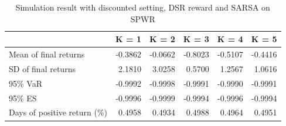 \documentclass{article}
\begin{document}
\begin{table}[H]
\centering
\begin{tabular}{|l|r|r|r|r|r|} 
\hline
                             & \multicolumn{1}{l|}{K = 1} & \multicolumn{1}{l|}{K = 2} & \multicolumn{1}{l|}{K = 3} & \multicolumn{1}{l|}{K = 4} & \multicolumn{1}{l|}{K = 5}  \\ 
\hline
Mean of final returns        & -0.3862                    & -0.0662                    & -0.8023                    & -0.5107                    & -0.4416                     \\ 
\hline
SD of final returns          & 2.1810                     & 3.0258                     & 0.5700                     & 1.2567                     & 1.0616                      \\ 
\hline
95\% VaR                     & -0.9992                    & -0.9998                    & -0.9991                    & -0.9990                    & -0.9991                     \\ 
\hline
95\% ES                      & -0.9996                    & -0.9999                    & -0.9994                    & -0.9996                    & -0.9994                     \\ 
\hline
Days of positive return (\%) & 0.4958                     & 0.4934                     & 0.4988                     & 0.4964                     & 0.4951                      \\
\hline
\end{tabular}
\caption{Simulation result with discounted setting, DSR reward and SARSA on SPWR}
\label{table13}
\end{table}
\end{document}
